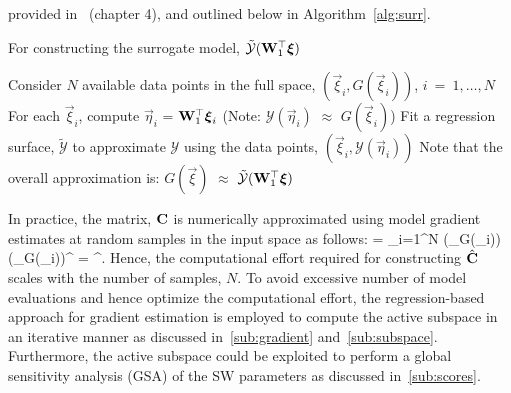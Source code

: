 provided in~\cite{Constantine:2015} (chapter 4), and outlined below in Algorithm~\ref{alg:surr}.
\bigskip
\begin{breakablealgorithm}
\renewcommand{\algorithmicrequire}{\textbf{Input:}}
\renewcommand{\algorithmicensure}{\textbf{Output:}}
  \caption{For constructing the surrogate model, $\tilde{\mathcal{Y}}(\mat{W}_1^\top\vec\xi)$}
  \begin{algorithmic}[1]
	  \State Consider $N$ available data points in the full space, $(\vec\xi_i,G(\vec\xi_i))$, $i~=~1,\ldots,N$
	  \State For each $\vec\xi_i$, compute $\vec\eta_i$ = $\mat{W}_1^\top\vec\xi_i$ 
          (Note: $\mathcal{Y}(\vec{\eta}_i)$ $\approx$ $G(\vec{\xi}_i)$)
	  \State Fit a regression surface, $\tilde{\mathcal{Y}}$ to approximate $\mathcal{Y}$ using the data
                 points, $(\vec\xi_i,\mathcal{Y}(\vec\eta_i))$
	  \State Note that the overall approximation is: $G(\vec{\xi})$ $\approx$
                 $\tilde{\mathcal{Y}}(\mat{W}_1^\top\vec{\xi})$ 
	\EndProcedure
  \end{algorithmic}
  \label{alg:surr}
\end{breakablealgorithm}
\bigskip

In practice, the matrix, $\mathbf{{C}}$ is numerically approximated using model gradient estimates at random samples
in the input space as follows:
 \be
 \approx {} = \sum\limits_{i=1}^{N} 
 (\nabla_{\vec{\xi}}G(\vec{\xi}_i))(\nabla_{\vec{\xi}}G(\vec{\xi}_i))^\top
 = \hat{\mat{\Lambda}}^\top.
\label{eq:chat}
 \ee
Hence, the computational effort required for constructing $\hat{\mathbf{{C}}}$ scales with the number of samples, $N$.
To avoid excessive number of model evaluations and hence optimize the computational effort, the regression-based
approach for gradient estimation is employed to compute the active subspace
in an iterative manner as discussed in~\ref{sub:gradient} and~\ref{sub:subspace}. Furthermore, the
active subspace could be exploited to perform a global sensitivity analysis (GSA) of the SW parameters as
discussed in~\ref{sub:scores}.




































